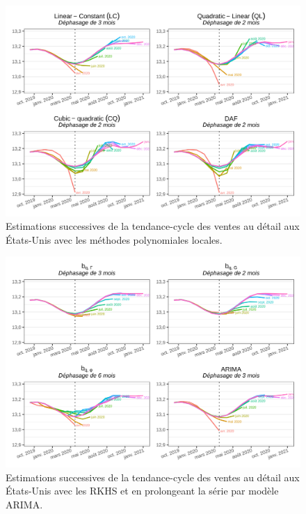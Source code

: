 \documentclass[
  12pt,
  a4paper,french]{article}
\newcommand\1{\mathds{1}}
\begin{document}
\begin{figure}

{\centering \includegraphics[width=0.9\linewidth]{img/nber/retailx_lp} 

}

\caption[Estimations successives de la tendance-cycle des ventes au détail aux États-Unis avec les méthodes polynomiales locales]{Estimations successives de la tendance-cycle des ventes au détail aux États-Unis avec les méthodes polynomiales locales.}\label{fig:retailxlp}

\footnotesize
\normalsize\end{figure}

\begin{figure}

{\centering \includegraphics[width=0.9\linewidth]{img/nber/retailx_rkhs_arima} 

}

\caption[Estimations successives de la tendance-cycle des ventes au détail aux États-Unis avec les RKHS et en prolongeant la série par modèle ARIMA]{Estimations successives de la tendance-cycle des ventes au détail aux États-Unis avec les RKHS et en prolongeant la série par modèle ARIMA.}\label{fig:retailxrkhs}

\footnotesize
\normalsize\end{figure}
\end{document}
